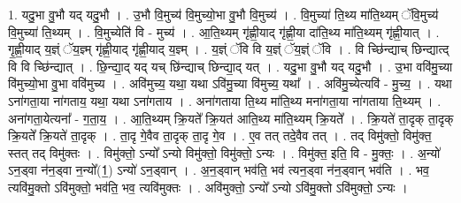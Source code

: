 \documentclass[17pt]{extarticle}
\begin{document}
1. यदु॒भा वु॒भौ यद् यदु॒भौ । . उ॒भौ वि॒मुच्य॑ वि॒मुच्यो॒भा वु॒भौ वि॒मुच्य॑ । . वि॒मुच्या॑ ति॒थ्य मा॑ति॒थ्यम् ॅवि॒मुच्य॑ वि॒मुच्या॑ ति॒थ्यम् । . वि॒मुच्येति॑ वि - मुच्य॑ । . आ॒ति॒थ्यम् गृ॑ह्णी॒याद् गृ॑ह्णी॒या दा॑ति॒थ्य मा॑ति॒थ्यम् गृ॑ह्णी॒यात् । . गृ॒ह्णी॒याद् य॒ज्ञ्ं ॅय॒ज्ञ्म् गृ॑ह्णी॒याद् गृ॑ह्णी॒याद् य॒ज्ञ्म् । . य॒ज्ञ्ं ॅवि वि य॒ज्ञ्ं ॅय॒ज्ञ्ं ॅवि । . वि च्छि॑न्द्याच् छिन्द्यात्द् वि वि च्छि॑न्द्यात् । . छि॒न्द्या॒द् यद् यच् छि॑न्द्याच् छिन्द्या॒द् यत् । . यदु॒भा वु॒भौ यद् यदु॒भौ । . उ॒भा ववि॑मु॒च्या वि॑मुच्यो॒भा वु॒भा ववि॑मुच्य । . अवि॑मुच्य॒ यथा॒ यथा ऽवि॑मु॒च्या वि॑मुच्य॒ यथा᳚ । . अवि॑मु॒च्येत्यवि॑ - मु॒च्य॒ । . यथा ऽना॑गता॒या ना॑गताय॒ यथा॒ यथा ऽना॑गताय । . अना॑गताया ति॒थ्य मा॑ति॒थ्य मना॑गता॒या ना॑गताया ति॒थ्यम् । . अना॑गता॒येत्यना᳚ - ग॒ता॒य॒ । . आ॒ति॒थ्यम् क्रि॒यते᳚ क्रि॒यत॑ आति॒थ्य मा॑ति॒थ्यम् क्रि॒यते᳚ । . क्रि॒यते॑ ता॒दृक् ता॒दृक् क्रि॒यते᳚ क्रि॒यते॑ ता॒दृक् । . ता॒दृ गे॒वैव ता॒दृक् ता॒दृ गे॒व । . ए॒व तत् तदे॒वैव तत् । . तद् विमु॑क्तो॒ विमु॑क्त॒ स्तत् तद् विमु॑क्तः । . विमु॑क्तो॒ ऽन्यो᳚ ऽन्यो विमु॑क्तो॒ विमु॑क्तो॒ ऽन्यः । . विमु॑क्त॒ इति॒ वि - मु॒क्तः॒ । . अ॒न्यो॑ ऽन॒ड्वा न॑न॒ड्वा न॒न्यो᳚(1॒) ऽन्यो॑ ऽन॒ड्वान् । . अ॒न॒ड्वान् भव॑ति॒ भव॑ त्यन॒ड्वा न॑न॒ड्वान् भव॑ति । . भव॒ त्यवि॑मु॒क्तो ऽवि॑मुक्तो॒ भव॑ति॒ भव॒ त्यवि॑मुक्तः । . अवि॑मुक्तो॒ ऽन्यो᳚ ऽन्यो ऽवि॑मु॒क्तो ऽवि॑मुक्तो॒ ऽन्यः । \newline
\end{document}
